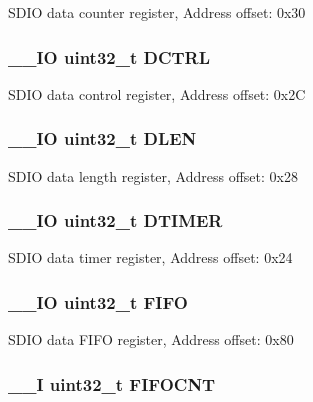 S\-D\-I\-O data counter register, Address offset\-: 0x30 \hypertarget{struct_s_d_i_o___type_def_a96a3d1a050982fccc23c2e6dbe0de068}{
\subsubsection[{D\-C\-T\-R\-L}]{\setlength{\rightskip}{0pt plus 5cm}\-\_\-\-\_\-\-I\-O uint32\-\_\-t D\-C\-T\-R\-L}}\label{struct_s_d_i_o___type_def_a96a3d1a050982fccc23c2e6dbe0de068}
S\-D\-I\-O data control register, Address offset\-: 0x2\-C \hypertarget{struct_s_d_i_o___type_def_a612edc78d2fa6288392f8ea32c36f7fb}{
\subsubsection[{D\-L\-E\-N}]{\setlength{\rightskip}{0pt plus 5cm}\-\_\-\-\_\-\-I\-O uint32\-\_\-t D\-L\-E\-N}}\label{struct_s_d_i_o___type_def_a612edc78d2fa6288392f8ea32c36f7fb}
S\-D\-I\-O data length register, Address offset\-: 0x28 \hypertarget{struct_s_d_i_o___type_def_a1dd219eaeee8d9def822da843028bd02}{
\subsubsection[{D\-T\-I\-M\-E\-R}]{\setlength{\rightskip}{0pt plus 5cm}\-\_\-\-\_\-\-I\-O uint32\-\_\-t D\-T\-I\-M\-E\-R}}\label{struct_s_d_i_o___type_def_a1dd219eaeee8d9def822da843028bd02}
S\-D\-I\-O data timer register, Address offset\-: 0x24 \hypertarget{struct_s_d_i_o___type_def_a68bef1da5fd164cf0f884b4209670dc8}{
\subsubsection[{F\-I\-F\-O}]{\setlength{\rightskip}{0pt plus 5cm}\-\_\-\-\_\-\-I\-O uint32\-\_\-t F\-I\-F\-O}}\label{struct_s_d_i_o___type_def_a68bef1da5fd164cf0f884b4209670dc8}
S\-D\-I\-O data F\-I\-F\-O register, Address offset\-: 0x80 \hypertarget{struct_s_d_i_o___type_def_ab27b78e19f487c845437c29812eecca7}{
\subsubsection[{F\-I\-F\-O\-C\-N\-T}]{\setlength{\rightskip}{0pt plus 5cm}\-\_\-\-\_\-\-I uint32\-\_\-t F\-I\-F\-O\-C\-N\-T}}\label{struct_s_d_i_o___type_def_ab27b78e19f487c845437c29812eecca7}
